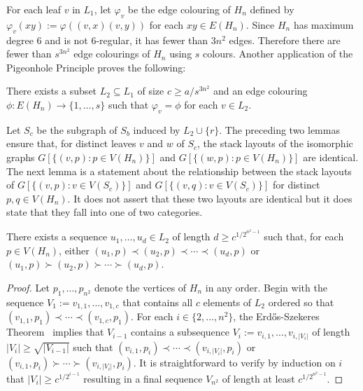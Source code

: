 \documentclass[kpfonts]{patmorin}
\renewcommand{\ge}{\geqslant}
\begin{document}

For each leaf $v$ in $L_1$, let $\varphi_v$ be the edge colouring of $H_n$ defined by $\varphi_v(xy):=\varphi((v,x)(v,y))$ for each $xy\in E(H_n)$. Since $H_n$ has maximum degree $6$ and is not 6-regular, it has fewer than $3n^2$ edges.  Therefore there are fewer than $s^{3n^2}$ edge colourings of $H_n$ using $s$ colours.  Another application of the Pigeonhole Principle proves the following:

\begin{lem}\label{uniform_colour}
    There exists a subset $L_2\subseteq L_1$ of size $c\ge a/s^{3n^2}$
    and an edge colouring $\phi:E(H_n)\to\{1,\ldots,s\}$ such that $\varphi_v=\phi$ for each $v\in L_2$.
\end{lem}


Let $S_{c}$ be the subgraph of $S_b$ induced by $L_2\cup\{r\}$. The preceding two lemmas ensure that, for distinct leaves $v$ and $w$ of $S_{c}$, the stack layouts of the isomorphic graphs $G[\{(v,p):p\in V(H_n)\}]$ and $G[\{(w,p):p\in V(H_n)\}]$ are identical. The next lemma is a statement about the relationship between the stack layouts of $G[\{(v,p):v\in V(S_{c})\}]$ and $G[\{(v,q):v\in V(S_{c})\}]$ for  distinct $p,q\in V(H_n)$.  It does not assert that these two layouts are identical but it does state that they fall into one of two categories.

\begin{lem}\label{forward_or_backward}
    There exists a sequence $u_1,\ldots,u_{d}\in L_2$ of length $d\ge c^{1/2^{n^2-1}}$ such that, for each $p\in V(H_n)$, either  $(u_1,p)\prec (u_2,p)\prec\cdots\prec (u_{d},p)$ or $(u_1,p)\succ (u_2,p)\succ\cdots\succ (u_{d},p)$.
\end{lem}

\begin{proof}
    Let $p_1,\ldots,p_{n^2}$ denote the vertices of $H_n$ in any order.
    Begin with the sequence $V_1:=v_{1,1},\ldots,v_{1,c}$ that contains all $c$ elements of $L_2$ ordered so that $(v_{1,1},p_1)\prec\cdots\prec(v_{1,c},p_1)$.  For each $i\in\{2,\ldots,n^2\}$, the Erd\H{o}s-Szekeres Theorem~\citep{ES35} implies that $V_{i-1}$ contains a subsequence $V_i:=v_{i,1},\ldots,v_{i,|V_i|}$ of length $|V_i|\ge \sqrt{|V_{i-1}|}$ such that $(v_{i,1},p_i)\prec\cdots\prec(v_{i,|V_i|},p_i)$ or $(v_{i,1},p_i)\succ\cdots\succ(v_{i,|V_i|},p_i)$.  It is straightforward to verify by induction on $i$ that $|V_i| \ge c^{1/2^{i-1}}$ resulting in a final sequence $V_{n^2}$ of length at least $c^{1/2^{n^2-1}}$.    
\end{proof}
\end{document}
